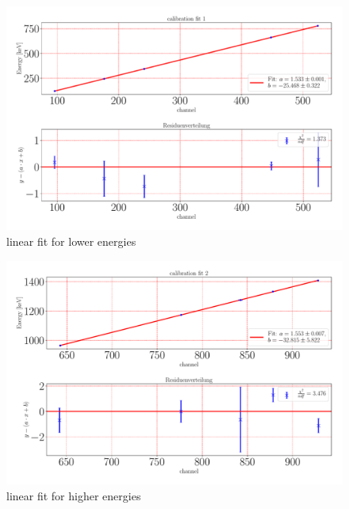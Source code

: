 \documentclass[a4paper,12pt]{article}
\begin{document}
\begin{figure}
\center
\includegraphics[scale=0.3]{../Figures/calibration fit 1.pdf}
\caption{linear fit for lower energies}
\label{calibFit}
\end{figure}

\begin{figure}
\center
\includegraphics[scale=0.3]{../Figures/calibration fit 2.pdf}
\caption{linear fit for higher energies}
\label{calibFit}
\end{figure}
\end{document}
